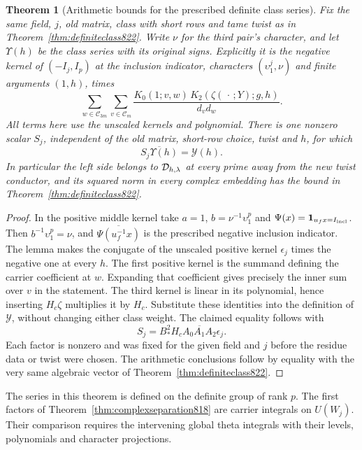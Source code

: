 \documentclass[a4paper,11pt]{article}
\newtheorem{theorem}[proposition]{Theorem}
\theoremstyle{definition}
\theoremstyle{remark}
\numberwithin{equation}{section}
\begin{document}
\begin{theorem}[Arithmetic bounds for the prescribed definite class series]
\leavevmode\label{thm:signedseries823}
Fix the same field, \(j\), old matrix, class with short rows
and tame twist as in Theorem~\ref{thm:definiteclass822}. Write
\(\nu\) for the third pair's character, and let \(\Upsilon(h)\)
be the class series with its original signs. Explicitly it
is the negative kernel of \((-I_j,I_p)\) at the inclusion
indicator, characters \((\upsilon_1^j,\nu)\) and finite
arguments \((1,h)\), times
\[
     \sum_{w\in\mathcal C_{3m}}\sum_{v\in\mathcal C_m}
       \frac{K_0(1;v,w)\,K_2(\zeta(\,\cdot\,;Y);g,h)}{d_v d_w}.
\]
All terms here use the unscaled kernels and polynomial. There
is one nonzero scalar \(S_j\), independent of the old matrix,
short-row choice, twist and \(h\), for which
\[
       \overline{S_j\Upsilon(h)}=\mathcal Y(h).
\]
In particular the left side belongs to \({\cal D}_{h,\lambda}\)
at every prime away from the new twist conductor, and its
squared norm in every complex embedding has the bound in
Theorem~\ref{thm:definiteclass822}.
\end{theorem}
\begin{proof}
In the positive middle kernel take \(a=1\),
\(b=\nu^{-1}\upsilon_1^p\) and
\(\Psi(x)={\bf1}_{u_f x=I_{\rm incl}}\). Then
\(b^{-1}\upsilon_1^p=\nu\), and
\(\overline{\Psi(u_f^{-1}x)}\) is the prescribed negative
inclusion indicator. The lemma makes the conjugate of the
unscaled positive kernel \(\epsilon_j\) times the negative
one at every \(h\). The first positive kernel is the summand
defining the carrier coefficient at \(w\). Expanding that
coefficient gives precisely the inner sum over \(v\)
in the statement. The third kernel is linear in its
polynomial, hence inserting \(H_c\zeta\) multiplies it by
\(H_c\). Substitute these identities into the definition
of \(\mathcal Y\), without changing either class weight.
The claimed equality follows with
\[
             S_j=B_*^2 H_c A_0\overline{A_1} A_2\epsilon_j .
\]
Each factor is nonzero and was fixed for the given field and
\(j\) before the residue data or twist were chosen.
The arithmetic conclusions follow by equality with the very
same algebraic vector of Theorem~\ref{thm:definiteclass822}.
\end{proof}

The series in this theorem is defined on the definite group
of rank \(p\). The first factors of
Theorem~\ref{thm:complexseparation818} are carrier integrals
on \(U(W_j)\). Their comparison requires the intervening
global theta integrals with their levels, polynomials and
character projections.
\clearpage
\end{document}
